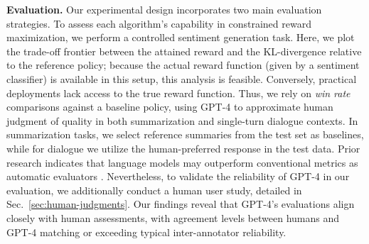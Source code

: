 \textbf{Evaluation.} Our experimental design incorporates two main evaluation strategies. To assess each algorithm’s capability in constrained reward maximization, we perform a controlled sentiment generation task. Here, we plot the trade-off frontier between the attained reward and the KL-divergence relative to the reference policy; because the actual reward function (given by a sentiment classifier) is available in this setup, this analysis is feasible. Conversely, practical deployments lack access to the true reward function. Thus, we rely on \textit{win rate} comparisons against a baseline policy, using GPT-4 to approximate human judgment of quality in both summarization and single-turn dialogue contexts. In summarization tasks, we select reference summaries from the test set as baselines, while for dialogue we utilize the human-preferred response in the test data. Prior research indicates that language models may outperform conventional metrics as automatic evaluators \citep{Chen2023ExploringTU}. Nevertheless, to validate the reliability of GPT-4 in our evaluation, we additionally conduct a human user study, detailed in Sec.~\ref{sec:human-judgments}. Our findings reveal that GPT-4’s evaluations align closely with human assessments, with agreement levels between humans and GPT-4 matching or exceeding typical inter-annotator reliability.

